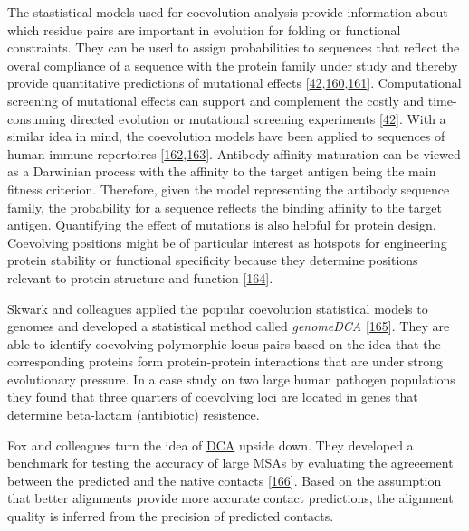 \documentclass[11pt,a4paper,twoside]{book}
\theoremstyle{definition}
\theoremstyle{definition}
\theoremstyle{remark}
\begin{document}
The stastistical models used for coevolution analysis provide
information about which residue pairs are important in evolution for
folding or functional constraints. They can be used to assign
probabilities to sequences that reflect the overal compliance of a
sequence with the protein family under study and thereby provide
quantitative predictions of mutational effects
{[}\protect\hyperlink{ref-Hopf2017}{42},\protect\hyperlink{ref-Wu2016}{160},\protect\hyperlink{ref-Figliuzzi2015}{161}{]}.
Computational screening of mutational effects can support and complement
the costly and time-consuming directed evolution or mutational screening
experiments {[}\protect\hyperlink{ref-Hopf2017}{42}{]}. With a similar
idea in mind, the coevolution models have been applied to sequences of
human immune repertoires
{[}\protect\hyperlink{ref-Asti2016}{162},\protect\hyperlink{ref-Elhanati2014}{163}{]}.
Antibody affinity maturation can be viewed as a Darwinian process with
the affinity to the target antigen being the main fitness criterion.
Therefore, given the model representing the antibody sequence family,
the probability for a sequence reflects the binding affinity to the
target antigen. Quantifying the effect of mutations is also helpful for
protein design. Coevolving positions might be of particular interest as
hotspots for engineering protein stability or functional specificity
because they determine positions relevant to protein structure and
function {[}\protect\hyperlink{ref-Franceus2016}{164}{]}.

Skwark and colleagues applied the popular coevolution statistical models
to genomes and developed a statistical method called \emph{genomeDCA}
{[}\protect\hyperlink{ref-Skwark2017}{165}{]}. They are able to identify
coevolving polymorphic locus pairs based on the idea that the
corresponding proteins form protein-protein interactions that are under
strong evolutionary pressure. In a case study on two large human
pathogen populations they found that three quarters of coevolving loci
are located in genes that determine beta-lactam (antibiotic) resistence.

Fox and colleagues turn the idea of \protect\hyperlink{abbrev}{DCA}
upside down. They developed a benchmark for testing the accuracy of
large \protect\hyperlink{abbrev}{MSAs} by evaluating the agreeement
between the predicted and the native contacts
{[}\protect\hyperlink{ref-Fox2016}{166}{]}. Based on the assumption that
better alignments provide more accurate contact predictions, the
alignment quality is inferred from the precision of predicted contacts.
\end{document}
